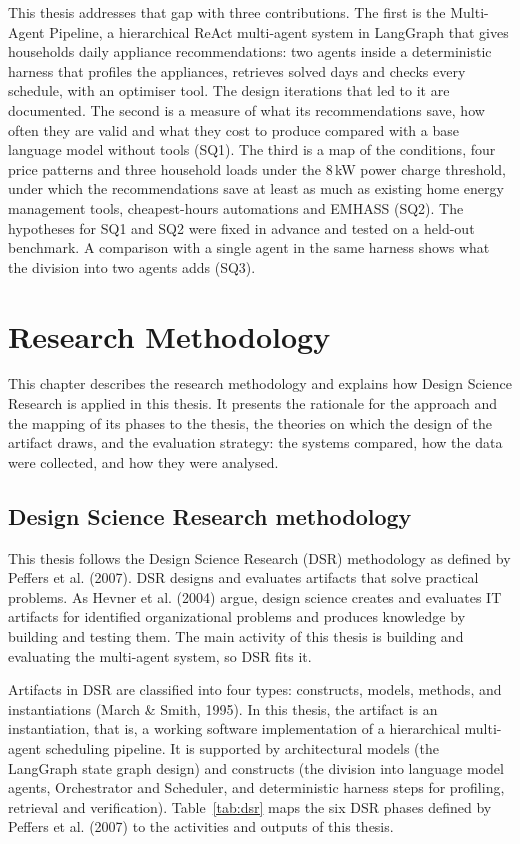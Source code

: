 \documentclass[12pt,a4paper]{report}
\begin{document}
This thesis addresses that gap with three contributions. The first is
the Multi-Agent Pipeline, a hierarchical ReAct multi-agent system in
LangGraph that gives households daily appliance recommendations: two
agents inside a deterministic harness that profiles the appliances,
retrieves solved days and checks every schedule, with an optimiser
tool. The design iterations that led to it are documented. The
second is a measure of what its recommendations save, how often they
are valid and what they cost to produce compared with a base language
model without tools (SQ1). The third is a map of the conditions, four
price patterns and three household loads under the 8\,kW power charge
threshold, under which the recommendations save at least as much as
existing home energy management tools, cheapest-hours automations and
EMHASS (SQ2). The hypotheses for SQ1 and SQ2 were fixed in advance and
tested on a held-out benchmark. A comparison with a single agent in the
same harness shows what the division into two agents adds (SQ3).

\chapter{Research Methodology}

This chapter describes the research methodology and explains how Design
Science Research is applied in this thesis. It presents the rationale
for the approach and the mapping of its phases to the thesis, the
theories on which the design of the artifact draws, and the evaluation
strategy: the systems compared, how the data were collected, and how
they were analysed.

\section{Design Science Research methodology}

This thesis follows the Design Science Research (DSR) methodology as
defined by Peffers et al. (2007). DSR designs and evaluates artifacts
that solve practical problems. As Hevner et al. (2004) argue, design
science creates and evaluates IT artifacts for identified organizational
problems and produces knowledge by building and testing them. The main
activity of this thesis is building and evaluating the multi-agent
system, so DSR fits it.

Artifacts in DSR are classified into four types: constructs, models,
methods, and instantiations (March \& Smith, 1995). In this thesis, the
artifact is an instantiation, that is, a working software implementation
of a hierarchical multi-agent scheduling pipeline. It is supported by
architectural models (the LangGraph state graph design) and constructs
(the division into language model agents, Orchestrator and Scheduler,
and deterministic harness steps for profiling, retrieval and
verification).
Table~\ref{tab:dsr} maps the six DSR phases defined by Peffers et al.
(2007) to the activities and outputs of this thesis.
\end{document}
